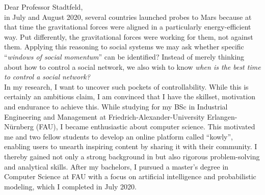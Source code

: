 Dear Professor Stadtfeld,\\

in July and August 2020, several countries launched probes to Mars because at that time the gravitational forces were aligned in a particularly energy-efficient way. 
Put differently, the gravitational forces were working for them, not against them.
Applying this reasoning to social systems we may ask whether specific ``\textit{windows of social momentum}'' can be identified? 
Instead of merely thinking about how to control a social network, we also wish to know \textit{when is the best time to control a social network?}\\

In my research, I want to uncover such pockets of controllability. 
While this is certainly an ambitious claim, I am convinced that I have the skillset, motivation and endurance to achieve this. 
While studying for my BSc in Industrial Engineering and Management at Friedrich-Alexander-University Erlangen-Nürnberg (FAU), I became enthusiastic about computer science. 
This motivated me and two fellow students to develop an online platform called ``kowly'', enabling users to unearth inspiring content by sharing it with their community. 
I thereby gained not only a strong background in  but also rigorous problem-solving and analytical skills. 
After my bachelors, I pursued a master's degree in Computer Science at FAU with a focus on artificial intelligence and probabilistic modeling, which I completed in July 2020. \\

